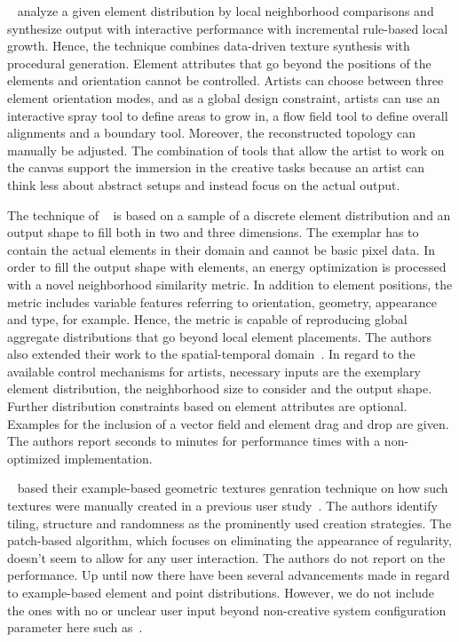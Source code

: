 \citeauthor*{ijiri_2008_aeb}~\cite{ijiri_2008_aeb} analyze a given element distribution by local neighborhood comparisons and synthesize output with interactive performance with incremental rule-based local growth. Hence, the technique combines data-driven texture synthesis with procedural generation. Element attributes that go beyond the positions of the elements and orientation cannot be controlled. Artists can choose between three element orientation modes, and as a global design constraint, artists can use an interactive spray tool to define areas to grow in, a flow field tool to define overall alignments and a boundary tool. Moreover, the reconstructed topology can manually be adjusted. The combination of tools that allow the artist to work on the canvas support the immersion in the creative tasks because an artist can think less about abstract setups and instead focus on the actual output.

The technique of \citeauthor*{ma_2011_det}~\cite{ma_2011_det} is based on a sample of a discrete element distribution and an output shape to fill both in two and three dimensions. The exemplar has to contain the actual elements in their domain and cannot be basic pixel data. In order to fill the output shape with elements, an energy optimization is processed with a novel neighborhood similarity metric. In addition to element positions, the metric includes  variable features referring to orientation, geometry, appearance and type, for example. Hence, the metric is capable of reproducing global aggregate distributions that go beyond local element placements. The authors also extended their work to the spatial-temporal domain~\cite{ma_2013_det}. In regard to the available control mechanisms for artists, necessary inputs are the exemplary element distribution, the neighborhood size to consider and the output shape. Further distribution constraints based on element attributes are optional. Examples for the inclusion of a vector field and element drag and drop are given. The authors report seconds to minutes for performance times with a non-optimized implementation.

\citeauthor*{almeraj_2013_pgt}~\cite{almeraj_2013_pgt} based their example-based geometric textures genration technique  on how such textures were manually created in a previous user study~\cite{almeraj_2011_tgt}. The authors identify tiling, structure and randomness as the prominently used creation strategies. The patch-based algorithm, which focuses on eliminating the appearance of regularity, doesn't seem to allow for any user interaction. The authors do not report on the performance. Up until now there have been several advancements made in regard to example-based element and point distributions. However, we do not include the ones with no or unclear user input beyond non-creative system configuration parameter here such as~\cite{peihan_2019_pps, chen_2019_mpc}.

